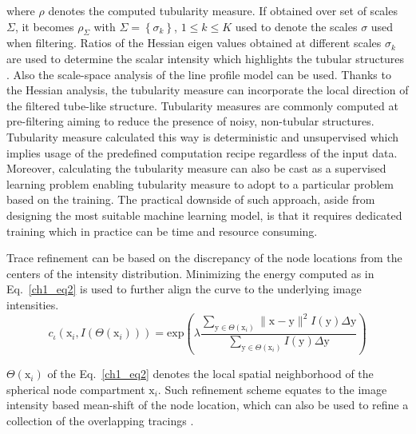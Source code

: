 where $ \rho $ denotes the computed tubularity measure. If obtained over set of scales $\Sigma$, it becomes $\rho_{\Sigma}$ with $\Sigma = \left\lbrace \sigma_k \right\rbrace$, $1 \leq k \leq K$ used to denote the scales $\sigma$ used when filtering. Ratios of the Hessian eigen values obtained at different scales $\sigma_k$ are used to determine the scalar intensity which highlights the tubular structures \cite{sato19973d,meijering2004design,frangi1998multiscale}. Also the scale-space analysis of the line profile model \cite{steger1998unbiased} can be used. Thanks to the Hessian analysis, the tubularity measure can incorporate the local direction of the filtered tube-like structure. Tubularity measures are commonly computed at pre-filtering aiming to reduce the presence of noisy, non-tubular structures. Tubularity measure calculated this way is deterministic and unsupervised  which implies usage of the predefined computation recipe regardless of the input data. Moreover, calculating the tubularity measure can also be cast as a supervised learning problem \cite{sironi2016multiscale,li2017deep} enabling tubularity measure to adopt to a particular problem based on the training. The practical downside of such approach, aside from designing the most suitable machine learning model, is that it requires dedicated training which in practice can be time and resource consuming.%

Trace refinement can be based on the discrepancy of the node locations from the centers of the intensity distribution. Minimizing the energy computed as in Eq.~\ref{ch1_eq2} is used to further align the curve to the underlying image intensities.  
\begin{equation}
c_{\iota}(\mathrm{x}_i, I(\Theta(\mathrm{x}_i))) = \text{exp} \left( \lambda \frac{ \sum\nolimits_{\mathrm{y} \in \Theta(\mathrm{x}_i)} \lVert \mathrm{x} - \mathrm{y} \rVert^2 I(\mathrm{y}) \Delta\mathrm{y}  }{\sum\nolimits_{\mathrm{y} \in \Theta(\mathrm{x}_i)} I(\mathrm{y}) \Delta\mathrm{y} } \right) 
\label{ch1_eq2}
\end{equation}

$\Theta(\mathrm{x}_i)$ of the Eq.~\ref{ch1_eq2} denotes the local spatial neighborhood of the spherical node compartment $\mathrm{x}_i$. Such refinement scheme equates to the image intensity based mean-shift \cite{cheng1995mean} of the node location, which can also be used to refine a collection of the overlapping tracings \cite{radojevic-pnr}.

